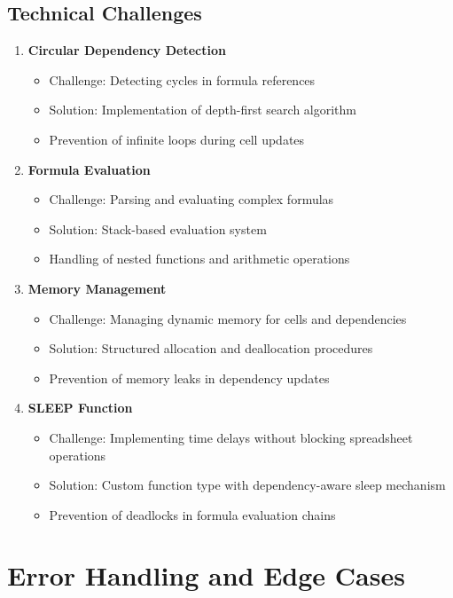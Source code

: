 \documentclass{article}
\begin{document}
\subsection{Technical Challenges}
\begin{enumerate}
    \item \textbf{Circular Dependency Detection}
    \begin{itemize}
        \item Challenge: Detecting cycles in formula references
        \item Solution: Implementation of depth-first search algorithm
        \item Prevention of infinite loops during cell updates
    \end{itemize}

    \item \textbf{Formula Evaluation}
    \begin{itemize}
        \item Challenge: Parsing and evaluating complex formulas
        \item Solution: Stack-based evaluation system
        \item Handling of nested functions and arithmetic operations
    \end{itemize}

    \item \textbf{Memory Management}
    \begin{itemize}
        \item Challenge: Managing dynamic memory for cells and dependencies
        \item Solution: Structured allocation and deallocation procedures
        \item Prevention of memory leaks in dependency updates
    \end{itemize}
    
    \item \textbf{SLEEP Function}
    \begin{itemize}
        \item Challenge: Implementing time delays without blocking spreadsheet operations
        \item Solution: Custom function type with dependency-aware sleep mechanism
        \item Prevention of deadlocks in formula evaluation chains
    \end{itemize}
\end{enumerate}

\section{Error Handling and Edge Cases}
\end{document}
